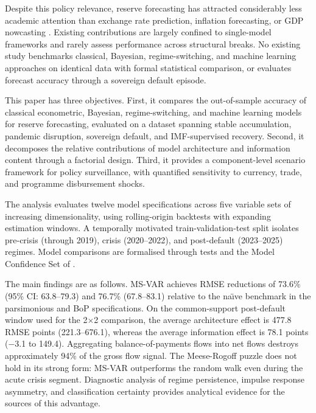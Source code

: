 \documentclass[12pt,a4paper]{article}
\begin{document}
Despite this policy relevance, reserve forecasting has attracted considerably less academic attention than exchange rate prediction, inflation forecasting, or GDP nowcasting \citep{Rossi2013}. Existing contributions are largely confined to single-model frameworks \citep{SehgalSharma2008,Gosselin2005} and rarely assess performance across structural breaks. No existing study benchmarks classical, Bayesian, regime-switching, and machine learning approaches on identical data with formal statistical comparison, or evaluates forecast accuracy through a sovereign default episode.

This paper has three objectives. First, it compares the out-of-sample accuracy of classical econometric, Bayesian, regime-switching, and machine learning models for reserve forecasting, evaluated on a dataset spanning stable accumulation, pandemic disruption, sovereign default, and IMF-supervised recovery. Second, it decomposes the relative contributions of model architecture and information content through a factorial design. Third, it provides a component-level scenario framework for policy surveillance, with quantified sensitivity to currency, trade, and programme disbursement shocks.

The analysis evaluates twelve model specifications across five variable sets of increasing dimensionality, using rolling-origin backtests with expanding estimation windows. A temporally motivated train-validation-test split isolates pre-crisis (through 2019), crisis (2020--2022), and post-default (2023--2025) regimes. Model comparisons are formalised through \cite{DieboldMariano1995} tests and the Model Confidence Set of \cite{HansenLundeNason2011}.

The main findings are as follows. MS-VAR achieves RMSE reductions of 73.6\% (95\% CI: 63.8--79.3) and 76.7\% (67.8--83.1) relative to the na\"{\i}ve benchmark in the parsimonious and BoP specifications. On the common-support post-default window used for the 2$\times$2 comparison, the average architecture effect is 477.8 RMSE points (221.3--676.1), whereas the average information effect is 78.1 points ($-$3.1 to 149.4). Aggregating balance-of-payments flows into net flows destroys approximately 94\% of the gross flow signal. The Meese-Rogoff puzzle does not hold in its strong form: MS-VAR outperforms the random walk even during the acute crisis segment. Diagnostic analysis of regime persistence, impulse response asymmetry, and classification certainty provides analytical evidence for the sources of this advantage.
\end{document}
